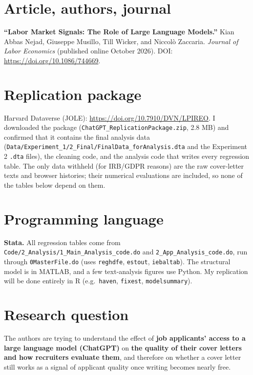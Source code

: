 


\section{Article, authors, journal}
\textbf{``Labor Market Signals: The Role of Large Language Models.''} Kian Abbas Nejad, Giuseppe Musillo, Till Wicker, and Niccol\`o Zaccaria. \emph{Journal of Labor Economics} (published online October 2026). DOI: \url{https://doi.org/10.1086/744669}.

\section{Replication package}
Harvard Dataverse (JOLE): \url{https://doi.org/10.7910/DVN/LPIREO}. I downloaded the package (\nolinkurl{ChatGPT_ReplicationPackage.zip}, 2.8 MB) and confirmed that it contains the final analysis data (\nolinkurl{Data/Experiment_1/2_Final/FinalData_forAnalysis.dta} and the Experiment 2 \texttt{.dta} files), the cleaning code, and the analysis code that writes every regression table. The only data withheld (for IRB/GDPR reasons) are the raw cover-letter texts and browser histories; their numerical evaluations are included, so none of the tables below depend on them.

\section{Programming language}
\textbf{Stata.} All regression tables come from \nolinkurl{Code/2_Analysis/1_Main_Analysis_code.do} and \nolinkurl{2_App_Analysis_code.do}, run through \texttt{0MasterFile.do} (uses \texttt{reghdfe}, \texttt{estout}, \texttt{iebaltab}). The structural model is in MATLAB, and a few text-analysis figures use Python. My replication will be done entirely in R (e.g.\ \texttt{haven}, \texttt{fixest}, \texttt{modelsummary}).

\section{Research question}
The authors are trying to understand the effect of \textbf{job applicants' access to a large language model (ChatGPT)} on \textbf{the quality of their cover letters and how recruiters evaluate them}, and therefore on whether a cover letter still works as a signal of applicant quality once writing becomes nearly free.

